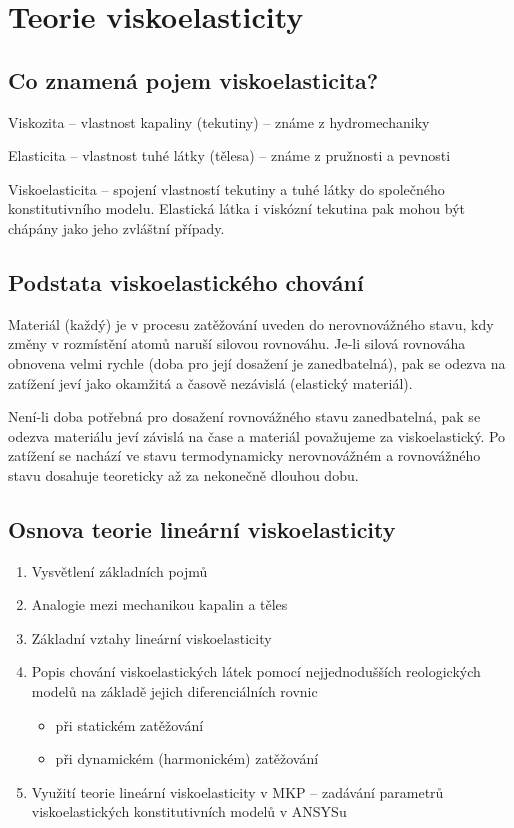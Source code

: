 
\section{Teorie viskoelasticity}

\subsection{Co znamená pojem viskoelasticita?}
Viskozita – vlastnost kapaliny (tekutiny) – známe z hydromechaniky

Elasticita – vlastnost tuhé látky (tělesa) – známe z pružnosti a pevnosti

Viskoelasticita – spojení vlastností tekutiny a tuhé látky do společného konstitutivního modelu. Elastická látka i viskózní tekutina pak mohou být chápány jako jeho zvláštní případy.

\subsection{Podstata viskoelastického chování}
Materiál (každý) je v procesu zatěžování uveden do nerovnovážného stavu, kdy změny v rozmístění atomů naruší silovou rovnováhu. Je-li silová rovnováha obnovena velmi rychle (doba pro její dosažení je zanedbatelná), pak se odezva na zatížení jeví jako okamžitá a časově nezávislá (elastický materiál).

Není-li doba potřebná pro dosažení rovnovážného stavu zanedbatelná, pak se odezva materiálu jeví závislá na čase a materiál považujeme za viskoelastický. Po zatížení se nachází ve stavu termodynamicky nerovnovážném a rovnovážného stavu dosahuje teoreticky až za nekonečně dlouhou dobu.

\subsection{Osnova teorie lineární viskoelasticity}
\begin{enumerate}
	\item Vysvětlení základních pojmů
	\item Analogie mezi mechanikou kapalin a těles
	\item Základní vztahy lineární viskoelasticity 
	\item Popis chování viskoelastických látek pomocí nejjednodušších reologických modelů na základě jejich diferenciálních rovnic
	\begin{itemize}
		\item při statickém zatěžování
		\item při dynamickém (harmonickém) zatěžování
	\end{itemize}
	\item Využití teorie lineární viskoelasticity v MKP -- zadávání parametrů viskoelastických konstitutivních modelů v ANSYSu
\end{enumerate}

